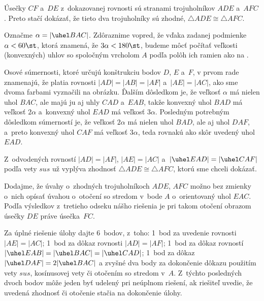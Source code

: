{%
Úsečky $CF$ a~$DE$ z~dokazovanej rovnosti sú stranami trojuholníkov
$ADE$ a~$AFC$. Preto stačí dokázať, že tieto dva trojuholníky sú
zhodné, $\triangle ADE\cong\triangle AFC$.

Označme $\alpha=|\uhel BAC|$. Zdôraznime vopred, že vďaka zadanej podmienke $\alpha<60\st$, ktorá znamená, že $3\alpha<180\st$, budeme môcť počítať veľkosti (konvexných) uhlov so spoločným vrcholom $A$ podľa polôh ich ramien ako na \obr{}.

Osové súmernosti, ktoré určujú konštrukciu bodov $D$, $E$ a~$F$,
v prvom rade znamenajú, že platia rovnosti $|AD|=|AB|=|AF|$
a~$|AE|=|AC|$, ako sme dvoma farbami vyznačili na obrázku.
Ďalším dôsledkom je, že veľkosť $\alpha$ má nielen uhol $BAC$, ale majú ju aj uhly $CAD$ a~$EAB$, takže konvexný uhol $BAD$ má veľkosť $2\alpha$ a~konvexný uhol $EAD$ má veľkosť $3\alpha$. Posledným potrebným dôsledkom súmerností je, že veľkosť $2\alpha$ má nielen uhol $BAD$, ale aj uhol $DAF$, a~preto konvexný uhol $CAF$ má veľkosť $3\alpha$, teda rovnakú ako skôr uvedený uhol
$EAD$.
%

Z~odvodených rovností $|AD|=|AF|$, $|AE|=|AC|$ a~$|\uhel EAD|=|\uhel CAF|$ podľa vety $sus$ už vyplýva zhodnosť $\triangle ADE\cong\triangle AFC$, ktorú sme chceli dokázať.

Dodajme, že úvahy o~zhodných trojuholníkoch $ADE$, $AFC$ možno bez zmienky o~nich opísať úvahou o~otočení so stredom v~bode $A$ o~orientovaný uhol $EAC$. Podľa výsledkov z~tretieho odseku nášho riešenia je pri takom otočení obrazom úsečky $DE$ práve úsečka~$FC$.

\schemaABC
Za úplné riešenie úlohy dajte 6~bodov, z~toho:
1~bod za uvedenie rovnosti $|AE|=|AC|$; 1~bod za dôkaz rovnosti $|AD|=|AF|$; 1~bod za dôkaz rovností $|\uhel EAB|=|\uhel BAC|=|\uhel CAD|$; 1~bod za dôkaz $|\uhel DAF|=2|\uhel BAC|$ a zvyšné dva body za dokončenie dôkazu
použitím vety $sus$, kosínusovej vety či otočením so stredom v~$A$. Z~týchto posledných dvoch bodov môže jeden byť udelený pri neúplnom riešení, ak riešiteľ uvedie, že uvedená zhodnosť či otočenie stačia na dokončenie úlohy.
\endschema
}

